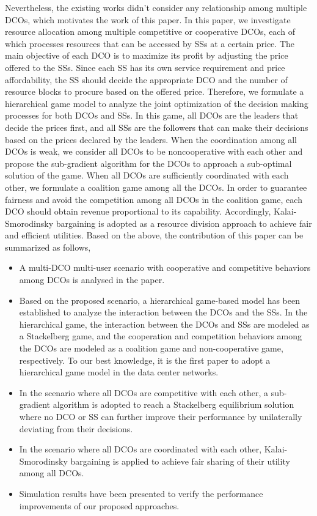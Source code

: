 \documentclass[twocolumn,10pt]{IEEEtran}
\begin{document}
Nevertheless, the existing works didn't consider any relationship among multiple DCOs, which motivates the work of this paper. In this paper, we investigate resource allocation among multiple competitive or cooperative DCOs, each of which processes resources that can be accessed by SSs at a certain price. The main objective of each DCO is to maximize its profit by adjusting the price offered to the SSs. Since each SS has its own service requirement and price affordability, the SS should decide the appropriate DCO and the number of resource blocks to procure based on the offered price. Therefore, we formulate a hierarchical game model to
analyze the joint optimization of the decision making processes for both DCOs and SSs.
In this game, all DCOs are the leaders that decide the prices first, and all SSs are the followers that can make
their decisions based on the prices declared by the leaders. When the coordination among all DCOs is weak, we consider all DCOs to be noncooperative with each other and propose the sub-gradient algorithm for the DCOs to approach a sub-optimal solution of the game. When all DCOs are sufficiently coordinated with each other, we formulate a coalition game among all the DCOs. In order to guarantee fairness and avoid the competition among all DCOs in the coalition game, each DCO should obtain revenue proportional to its capability. Accordingly, Kalai-Smorodinsky bargaining is adopted as a resource division approach to achieve fair and efficient utilities. Based on the above, the contribution of this paper can be summarized as follows,

\begin{itemize}
  \item A multi-DCO multi-user scenario with cooperative and competitive behaviors among DCOs is analysed in the paper.
  \item Based on the proposed scenario, a hierarchical game-based model has been established to analyze the interaction between the DCOs and the SSs. In the hierarchical game, the interaction between the DCOs and SSs are modeled as a Stackelberg game, and the cooperation and competition behaviors among the DCOs are modeled as a coalition game and non-cooperative game, respectively. To our best knowledge, it is the first paper to adopt a hierarchical game model in the data center networks.
  \item In the scenario where all DCOs are competitive with each other, a sub-gradient algorithm is adopted to reach a Stackelberg equilibrium solution where no DCO or SS can further improve their performance by unilaterally deviating from their decisions.
  \item In the scenario where all DCOs are coordinated with each other, Kalai-Smorodinsky bargaining is applied to achieve fair sharing of their utility among all DCOs.
  \item Simulation results have been presented to verify the performance improvements of our proposed approaches.
\end{itemize}
\end{document}

